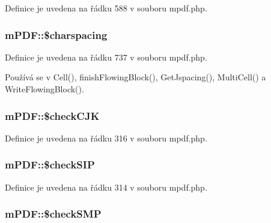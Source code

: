 Definice je uvedena na řádku 588 v souboru mpdf.\-php.

\hypertarget{classm_p_d_f_a2f078e826d29f4d4e6aeb9319a6e4f5f}{
\subsubsection[{\$charspacing}]{\setlength{\rightskip}{0pt plus 5cm}m\-P\-D\-F\-::\$charspacing}}\label{classm_p_d_f_a2f078e826d29f4d4e6aeb9319a6e4f5f}


Definice je uvedena na řádku 737 v souboru mpdf.\-php.



Používá se v Cell(), finish\-Flowing\-Block(), Get\-Jspacing(), Multi\-Cell() a Write\-Flowing\-Block().

\hypertarget{classm_p_d_f_a918dcc6948cf6d2b89de9f7d5c266325}{
\subsubsection[{\$check\-C\-J\-K}]{\setlength{\rightskip}{0pt plus 5cm}m\-P\-D\-F\-::\$check\-C\-J\-K}}\label{classm_p_d_f_a918dcc6948cf6d2b89de9f7d5c266325}


Definice je uvedena na řádku 316 v souboru mpdf.\-php.

\hypertarget{classm_p_d_f_ad8e84e644462e35265f4d79987b82a45}{
\subsubsection[{\$check\-S\-I\-P}]{\setlength{\rightskip}{0pt plus 5cm}m\-P\-D\-F\-::\$check\-S\-I\-P}}\label{classm_p_d_f_ad8e84e644462e35265f4d79987b82a45}


Definice je uvedena na řádku 314 v souboru mpdf.\-php.

\hypertarget{classm_p_d_f_a01affc751cbe9be5b0fb3c6cee4f85db}{
\subsubsection[{\$check\-S\-M\-P}]{\setlength{\rightskip}{0pt plus 5cm}m\-P\-D\-F\-::\$check\-S\-M\-P}}\label{classm_p_d_f_a01affc751cbe9be5b0fb3c6cee4f85db}


